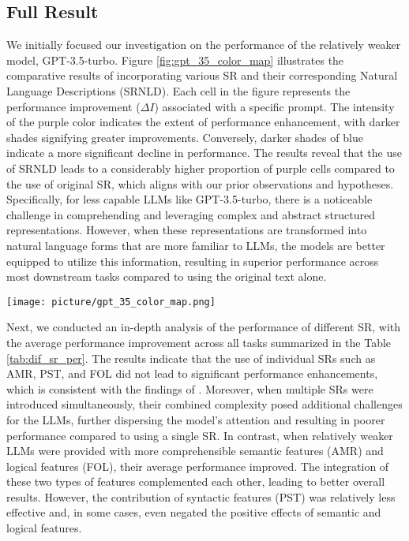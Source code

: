 

\subsection{Full Result}
We initially focused our investigation on the performance of the relatively weaker model, GPT-3.5-turbo. Figure \ref{fig:gpt_35_color_map} illustrates the comparative results of incorporating various SR and their corresponding Natural Language Descriptions (SRNLD). Each cell in the figure represents the performance improvement ($\Delta I$) associated with a specific prompt. The intensity of the purple color indicates the extent of performance enhancement, with darker shades signifying greater improvements. Conversely, darker shades of blue indicate a more significant decline in performance. The results reveal that the use of SRNLD leads to a considerably higher proportion of purple cells compared to the use of original SR, which aligns with our prior observations and hypotheses. Specifically, for less capable LLMs like GPT-3.5-turbo, there is a noticeable challenge in comprehending and leveraging complex and abstract structured representations. However, when these representations are transformed into natural language forms that are more familiar to LLMs, the models are better equipped to utilize this information, resulting in superior performance across most downstream tasks compared to using the original text alone.

\begin{figure*}
\centering
\vspace{0in}
\texttt{[image: picture/gpt\_35\_color\_map.png]}
\caption{GPT-3.5-turbo Performance}
\label{fig:gpt_35_color_map}
\vspace{-0.1in}
\end{figure*}


Next, we conducted an in-depth analysis of the performance of different SR, with the average performance improvement across all tasks summarized in the Table \ref{tab:dif_sr_per}. The results indicate that the use of individual SRs such as AMR, PST, and FOL did not lead to significant performance enhancements, which is consistent with the findings of \cite{jin2024analyzing}. Moreover, when multiple SRs were introduced simultaneously, their combined complexity posed additional challenges for the LLMs, further dispersing the model’s attention and resulting in poorer performance compared to using a single SR. In contrast, when relatively weaker LLMs were provided with more comprehensible semantic features (AMR) and logical features (FOL), their average performance improved. The integration of these two types of features complemented each other, leading to better overall results. However, the contribution of syntactic features (PST) was relatively less effective and, in some cases, even negated the positive effects of semantic and logical features.



